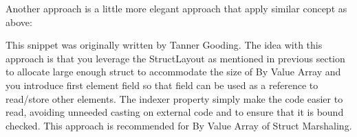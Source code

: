 
\newpage
Another approach is a little more elegant approach that apply similar concept as above:



This snippet was originally written by Tanner Gooding.
\newline
\newline
The idea with this approach is that you leverage the StructLayout as mentioned in previous section to allocate large enough struct to accommodate the size of By Value Array and you introduce first element field so that field can be used as a reference to read/store other elements. The indexer property simply make the code easier to read, avoiding unneeded casting on external code and to ensure that it is bound checked. This approach is recommended for By Value Array of Struct Marshaling.

